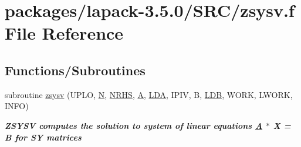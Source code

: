\hypertarget{zsysv_8f}{}\section{packages/lapack-\/3.5.0/\+S\+R\+C/zsysv.f File Reference}
\label{zsysv_8f}
\subsection*{Functions/\+Subroutines}
\begin{DoxyCompactItemize}
\item 
subroutine \hyperlink{group__complex16SYsolve_ga6109aefb1ad317ed676178c4154f3fdd}{zsysv} (U\+P\+L\+O, \hyperlink{polmisc_8c_a0240ac851181b84ac374872dc5434ee4}{N}, \hyperlink{example__user_8c_aa0138da002ce2a90360df2f521eb3198}{N\+R\+H\+S}, \hyperlink{classA}{A}, \hyperlink{example__user_8c_ae946da542ce0db94dced19b2ecefd1aa}{L\+D\+A}, I\+P\+I\+V, B, \hyperlink{example__user_8c_a50e90a7104df172b5a89a06c47fcca04}{L\+D\+B}, W\+O\+R\+K, L\+W\+O\+R\+K, I\+N\+F\+O)
\begin{DoxyCompactList}\small\item\em {\bfseries  Z\+S\+Y\+S\+V computes the solution to system of linear equations \hyperlink{classA}{A} $\ast$ X = B for S\+Y matrices} \end{DoxyCompactList}\end{DoxyCompactItemize}
